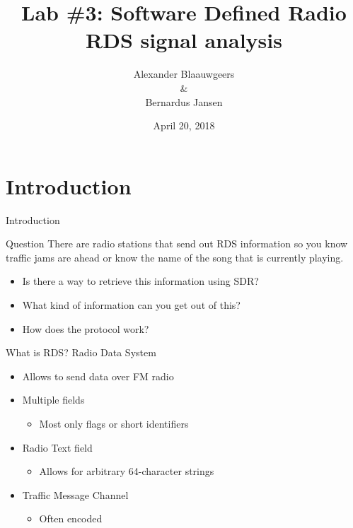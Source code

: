 \documentclass[10pt]{beamer}
\title[]{Lab \#3: Software Defined Radio \\ RDS signal analysis } %
\author{Alexander Blaauwgeers \\ \& \\ Bernardus Jansen} %
\institute[University of Amsterdam] %
{
University of Amsterdam \\ %
\medskip
}
\date{April 20, 2018} %
\begin{document}
\begin{frame}
\titlepage %
\end{frame}

\section{Introduction }
\begin{frame}{Introduction}
\begin{block}{Question}
There are radio stations that send out RDS information so you know traffic jams are ahead or know the name of the
song that is currently playing.
\begin{itemize}
    \item Is there a way to retrieve this information using SDR?
    \item What kind of information can you get out of this?
    \item How does the protocol work?
\end{itemize}
\end{block}
\end{frame}

\begin{frame}{What is RDS?}
Radio Data System

\begin{itemize}
    \item Allows to send data over FM radio
    \item Multiple fields
    \begin{itemize}
        \item Most only flags or short identifiers
    \end{itemize}
    \item Radio Text field
    \begin{itemize}
        \item Allows for arbitrary 64-character strings
    \end{itemize}
    \item Traffic Message Channel
    \begin{itemize}
        \item Often encoded
    \end{itemize}
\end{itemize}
\end{frame}

\end{document}
